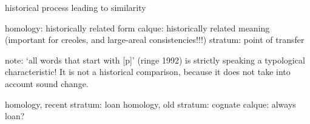 \label{ch:history}

historical process leading to similarity

homology: historically related form
calque: historically related meaning (important for creoles, and large-areal consistencies!!!)
stratum: point of transfer

note: `all words that start with [p]' (ringe 1992) is strictly speaking a typological characteristic! It is not a historical comparison, because it does not take into account sound change.

homology, recent stratum: loan
homology, old stratum: cognate
calque: always loan?